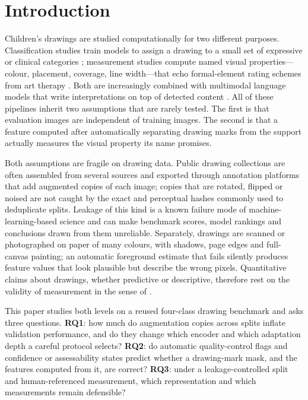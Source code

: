 \documentclass[pdflatex,sn-mathphys-num]{sn-jnl}
\begin{document}
\section{Introduction}\label{sec:intro}

Children's drawings are studied computationally for two different purposes. Classification studies train models to assign a drawing to a small set of expressive or clinical categories \cite{ali2022sensing,ciftci2025kido}; measurement studies compute named visual properties---colour, placement, coverage, line width---that echo formal-element rating schemes from art therapy \cite{gantt2001feats,kim2007placement,kim2007colour}. Both are increasingly combined with multimodal language models that write interpretations on top of detected content \cite{ma2025pick,binaei2026artcognition,psydraw2024}. All of these pipelines inherit two assumptions that are rarely tested. The first is that evaluation images are independent of training images. The second is that a feature computed after automatically separating drawing marks from the support actually measures the visual property its name promises.

Both assumptions are fragile on drawing data. Public drawing collections are often assembled from several sources and exported through annotation platforms that add augmented copies of each image; copies that are rotated, flipped or noised are not caught by the exact and perceptual hashes commonly used to deduplicate splits. Leakage of this kind is a known failure mode of machine-learning-based science \cite{kapoor2023leakage} and can make benchmark scores, model rankings and conclusions drawn from them unreliable. Separately, drawings are scanned or photographed on paper of many colours, with shadows, page edges and full-canvas painting; an automatic foreground estimate that fails silently produces feature values that look plausible but describe the wrong pixels. Quantitative claims about drawings, whether predictive or descriptive, therefore rest on the validity of measurement in the sense of \cite{jacobs2021measurement}.

This paper studies both levels on a reused four-class drawing benchmark and asks three questions. \textbf{RQ1}: how much do augmentation copies across splits inflate validation performance, and do they change which encoder and which adaptation depth a careful protocol selects? \textbf{RQ2}: do automatic quality-control flags and confidence or assessability states predict whether a drawing-mark mask, and the features computed from it, are correct? \textbf{RQ3}: under a leakage-controlled split and human-referenced measurement, which representation and which measurements remain defensible?
\end{document}
